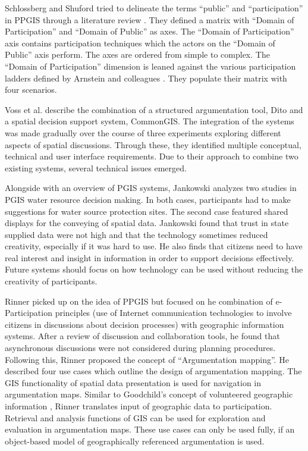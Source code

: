 Schlossberg and Shuford tried to delineate the terms ``public'' and ``participation'' in PPGIS through a literature review \cite{Schlossberg2005_PPGIS}. They defined a matrix with ``Domain of Participation'' and ``Domain of Public'' as axes. The ``Domain of Participation'' axis contains participation techniques which the actors on the ``Domain of Public'' axis perform. The axes are ordered from simple to complex. The ``Domain of Participation'' dimension is leaned against the various participation ladders defined by Arnstein and colleagues \cite{Arnstein1969_citizen_participation,Wiedemann1993355,Connor1988_new_ladder}. They populate their matrix with four scenarios.

Voss et al. \cite{Voss2004_Evolution_PGIS} describe the combination of a structured argumentation tool, Dito and a spatial decision support system, CommonGIS. The integration of the systems was made gradually over the course of three experiments exploring different aspects of spatial discussions. Through these, they identified multiple conceptual, technical and user interface requirements. Due to their approach to combine two existing systems, several technical issues emerged.

Alongside with an overview of PGIS systems, Jankowski \cite{Jankowski2005_community_based_pgis} analyzes two studies in PGIS water resource decision making. In both cases, participants had to make suggestions for water source protection sites. The second case featured shared displays for the conveying of spatial data. Jankowski found that trust in state supplied data were not high and that the technology sometimes reduced creativity, especially if it was hard to use. He also finds that citizens need to have real interest and insight in information in order to support decisions effectively. Future systems should focus on how technology can be used without reducing the creativity of participants.

Rinner \cite{Rinner_ArgumentationMaps} picked up on the idea of PPGIS but focused on he combination of e-Participation principles (use of Internet communication technologies to involve citizens in discussions about decision processes) with geographic information systems. After a review of discussion and collaboration tools, he found that asynchronous discussions were not considered during planning procedures. Following this, Rinner proposed the concept of ``Argumentation mapping''. He described four use cases which outline the design of argumentation mapping. The GIS functionality of spatial data presentation is used for navigation in argumentation maps. Similar to Goodchild's concept of volunteered geographic information \cite{goodchild2007citizens}, Rinner translates input of geographic data to participation. Retrieval and analysis functions of GIS can be used for exploration and evaluation in argumentation maps. These use cases can only be used fully, if an object-based model of geographically referenced argumentation is used.

